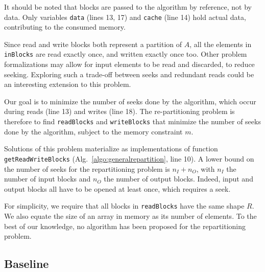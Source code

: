 \documentclass[sigconf, nonacm]{acmart}
\newcommand{\tristan}[1]{\marginnote{\small \color{orange}\textbf{From Tristan:}#1\color{black}}[3cm]}
\begin{document}
It should be noted that blocks are passed to the algorithm by reference,
not by data. Only variables \texttt{data} (lines 13, 17) and \texttt{cache}
(line 14) hold actual data, contributing to the consumed memory.

Since read and write blocks both represent a partition of $A$, all the
elements in \texttt{inBlocks} are read exactly once, and written exactly once too. Other
problem formalizations may allow for input elements to be read and
discarded, to reduce seeking. Exploring such a trade-off
between seeks and redundant reads could be an interesting extension to this problem.

Our goal is to minimize the number of seeks done by the algorithm, which
occur during reads (line 13) and writes (line 18). The re-partitioning
problem is therefore to find \texttt{readBlocks} and \texttt{writeBlocks} that
minimize the number of
seeks done by the algorithm, subject to the memory constraint $m$.


Solutions of this problem materialize as implementations of function
\texttt{getReadWriteBlocks} (Alg.~\ref{algo:generalrepartition}, line 10). A
lower bound on the number of seeks for the repartitioning problem is $n_I +
n_O$, with $n_I$ the number of input blocks and $n_O$ the number of output
blocks. Indeed, input and output blocks all have to be opened at least
once, which requires a seek.

For simplicity, we require that all blocks in \texttt{readBlocks} have the
same shape $R$. We also equate the size of an array in memory as its
number of elements. To the best of our knowledge, no algorithm has been
proposed for the repartitioning problem.


\subsection{Baseline}
\end{document}

